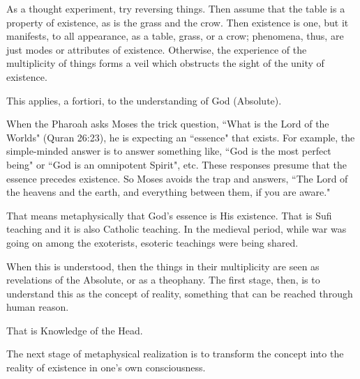 As a thought experiment, try reversing things. Then assume that the table is a property of existence, as is the grass and the crow. Then existence is one, but it manifests, to all appearance, as a table, grass, or a crow; phenomena, thus, are just modes or attributes of existence. Otherwise, the experience of the multiplicity of things forms a veil which obstructs the sight of the unity of existence.

This applies, a fortiori, to the understanding of God (Absolute). 
\begin{quotex}
When the Pharoah asks Moses the trick question, ``What is the Lord of the Worlds" (Quran 26:23), he is expecting an ``essence" that exists. For example, the simple-minded answer is to answer something like, ``God is the most perfect being" or ``God is an omnipotent Spirit", etc. These responses presume that the essence precedes existence. So Moses avoids the trap and answers, ``The Lord of the heavens and the earth, and everything between them, if you are aware." 
\end{quotex}

That means metaphysically that God's essence is His existence. That is Sufi teaching and it is also Catholic teaching. In the medieval period, while war was going on among the exoterists, esoteric teachings were being shared.

When this is understood, then the things in their multiplicity are seen as revelations of the Absolute, or as a theophany. The first stage, then, is to understand this as the concept of reality, something that can be reached through human reason.

That is Knowledge of the Head.

The next stage of metaphysical realization is to transform the concept into the reality of existence in one's own consciousness.



